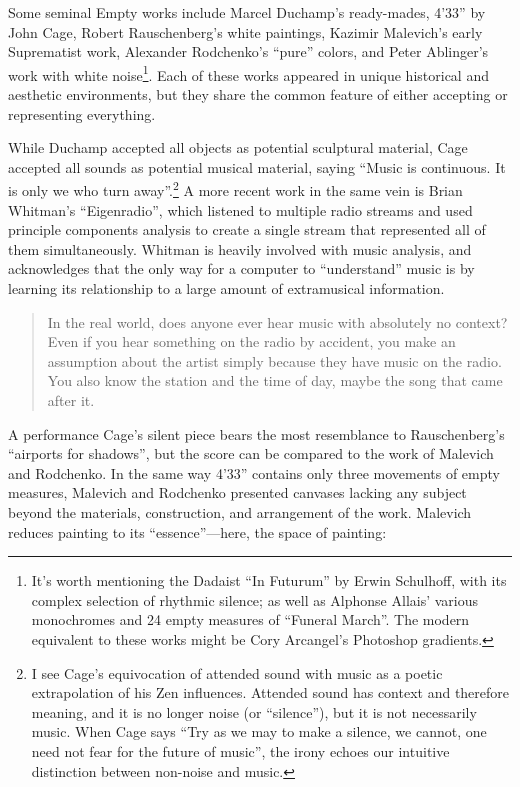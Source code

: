 \documentclass{thesis}
\begin{document}
Some seminal Empty works include Marcel Duchamp's ready-mades, 4'33'' by John Cage\cite{larry_j_solomon_sounds_1998}, Robert Rauschenberg's white paintings, Kazimir Malevich's early Suprematist work\cite{moma_kazimir_2006}, Alexander Rodchenko's ``pure'' colors\cite{moma_rodchenko_1998}, and Peter Ablinger's work with white noise\footnote{It's worth mentioning the Dadaist ``In Futurum'' by   Erwin Schulhoff, with its complex selection of rhythmic silence; as well as Alphonse Allais' various monochromes and 24 empty measures of ``Funeral March''. The modern equivalent to these works might be Cory Arcangel's Photoshop gradients.\cite{cory_arcangel_photoshop_2009}}. Each of these works appeared in unique historical and aesthetic environments, but they share the common feature of either accepting or representing everything.

While Duchamp accepted all objects as potential sculptural material, Cage accepted all sounds as potential musical material, saying ``Music is continuous. It is only we who turn away''.\footnote{I see Cage's equivocation of attended sound with music as a poetic extrapolation of his Zen influences. Attended sound has context and therefore meaning, and it is no longer noise (or ``silence''), but it is not necessarily music. When Cage says ``Try as we may to make a silence, we cannot, one need not fear for the future of music'', the irony echoes our intuitive distinction between non-noise and music.} A more recent work in the same vein is Brian Whitman's ``Eigenradio''\cite{brian_whitman_eigenradio_2005}, which listened to multiple radio streams and used principle components analysis to create a single stream that represented all of them simultaneously. Whitman is heavily involved with music analysis, and acknowledges that the only way for a computer to ``understand'' music is by learning its relationship to a large amount of extramusical information.
	
	\begin{quote}
	In the real world, does anyone ever hear music with absolutely no context? Even if you hear something on the radio by accident, you make an assumption about the artist simply because they have music on the radio. You also know the station and the time of day, maybe the song that came after it.
	\end{quote}

A performance Cage's silent piece bears the most resemblance to Rauschenberg's ``airports for shadows'', but the score can be compared to the work of Malevich and Rodchenko. In the same way 4'33'' contains only three movements of empty measures, Malevich and Rodchenko presented canvases lacking any subject beyond the materials, construction, and arrangement of the work. Malevich reduces painting to its ``essence''---here, the space of painting:
\end{document}
